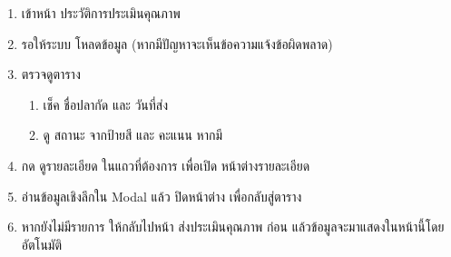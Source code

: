 \par

\begin{sloppypar}
	\begin{enumerate}
		\item เข้าหน้า ประวัติการประเมินคุณภาพ
		\item รอให้ระบบ โหลดข้อมูล (หากมีปัญหาจะเห็นข้อความแจ้งข้อผิดพลาด)
		\item ตรวจดูตาราง
		\begin{enumerate}
			\item เช็ค ชื่อปลากัด และ วันที่ส่ง
			\item ดู สถานะ จากป้ายสี และ คะแนน หากมี
		\end{enumerate}
		\item กด ดูรายละเอียด ในแถวที่ต้องการ เพื่อเปิด หน้าต่างรายละเอียด
		\item อ่านข้อมูลเชิงลึกใน Modal แล้ว ปิดหน้าต่าง เพื่อกลับสู่ตาราง
		\item หากยังไม่มีรายการ ให้กลับไปหน้า ส่งประเมินคุณภาพ ก่อน แล้วข้อมูลจะมาแสดงในหน้านี้โดยอัตโนมัติ
	\end{enumerate}
\end{sloppypar}

\clearpage